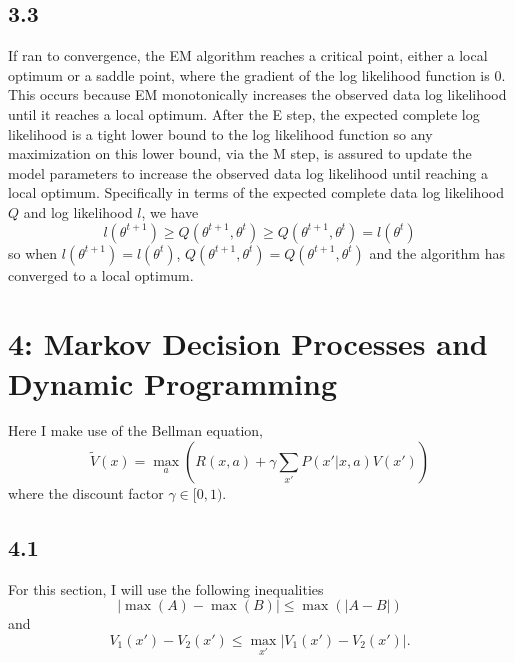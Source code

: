 \documentclass[12pt]{amsart}
\begin{document}
\subsection*{3.3}
If ran to convergence, the EM algorithm reaches a critical point, either a local optimum or a saddle point, where the gradient of the log likelihood function is 0.  This occurs because EM monotonically increases the observed data log likelihood until it reaches a local optimum.  After the E step, the expected complete log likelihood is a tight lower bound to the log likelihood function so any maximization on this lower bound, via the M step, is assured to update the model parameters to increase the observed data log likelihood until reaching a local optimum.  Specifically in terms of the expected complete data log likelihood $Q$ and log likelihood $l$, we have
\begin{equation}
l(\theta^{t+1}) \geq Q(\theta^{t+1},\theta^{t}) \geq Q(\theta^{t+1},\theta^{t}) = l(\theta^{t}) 
\end{equation}
so when $l(\theta^{t+1}) = l(\theta^{t})$, $Q(\theta^{t+1},\theta^{t}) = Q(\theta^{t+1},\theta^{t})$ and the algorithm has converged to a local optimum.

\section*{4: Markov Decision Processes and Dynamic Programming}
Here I make use of the Bellman equation,
\begin{equation}
\tilde{V}(x) = \max_a \left( R(x,a) + \gamma \sum_{x'}P(x'|x,a)V(x') \right)
\end{equation}
where the discount factor $\gamma \in [0,1)$.

\subsection*{4.1}
For this section, I will use the following inequalities
\begin{equation} \label{eqn:max_ab}
|\max(A) - \max(B) | \leq \max(|A-B|)
\end{equation}
and
\begin{equation} \label{eqn:max_v}
V_1(x') - V_2(x') \leq \max_{x'} |V_1(x') - V_2(x')|.
\end{equation}
\end{document}
